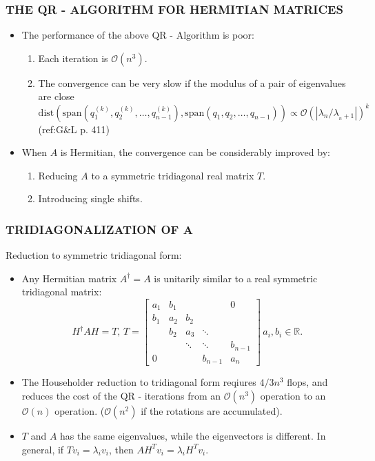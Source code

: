 \documentclass[a4paper,8pt]{beamer} %
\newcommand{\smatrix}[1]{\left[\begin{matrix} #1 \end{matrix}\right]}
\begin{document}
\begin{frame}[label=framelb1]  %
\frametitle{THE QR - ALGORITHM FOR HERMITIAN MATRICES }
\begin{itemize}
\item <1-> The performance of the above QR - Algorithm is poor:
	\begin{enumerate}
		\item Each iteration is $\mathcal O(n^3)$.
		\item The convergence can be very slow if the modulus of a pair of eigenvalues are close
		\[ \text{dist}(\text{span}(q_1^{(k)},q_2^{(k)},\dots,q_{n-1}^{(k)})
			,\text{span}(q_1,q_2,\dots,q_{n-1})) \propto \mathcal O(|\lambda_{n}/\lambda_{_n+1}|)^k \]
		(ref:G\&L p. 411)	
		\hyperlink{dist span}{\beamergotobutton{(*)}}
	\end{enumerate}
\item <2-> When $A$ is Hermitian, the convergence can be considerably improved by:
	\begin{enumerate}
		\item Reducing $A$ to a symmetric tridiagonal real matrix $T$.
		\item Introducing single shifts. 
	\end{enumerate}
\end{itemize}
\end{frame} %
\begin{frame}[label=tridiagonalizationofa]  %
\frametitle{TRIDIAGONALIZATION OF A}
Reduction to symmetric tridiagonal form:
\begin{itemize}
	\item <1-> Any Hermitian matrix $A^\dagger = A$ is unitarily similar to a real symmetric tridiagonal matrix:
\begin{equation}
H^\dagger AH = T,\, 
T=
	\smatrix{
		a_1 & b_1 & & & 0\\
		b_1 & a_2 & b_2 & & \\
		& b_2 & a_3 & \ddots & \\
		& & \ddots	& \ddots & b_{n-1} \\
		0& & & b_{n-1}& a_n 
	}
	\, a_i, b_i \in \mathbb R.
\end{equation}
	\item <2->
		The Householder reduction to tridiagonal form reqiures $ 4/3 n^3$ flops, and reduces the cost of the 
		QR - iterations from an $\mathcal O(n^3)$ operation to an $\mathcal O(n)$ operation. 
		($\mathcal O(n^2)$ if the rotations are accumulated).
	\item  <3->
		$T$ and $A$ has the same eigenvalues, while the eigenvectors 
		is different. In general, if $Tv_i = \lambda_iv_i$, then $A H^T v_i = \lambda_i H^Tv_i$.
\end{itemize}	
\begin{footnotesize}
	\hyperlink{householders explained}{\beamergotobutton{(*)}} 
\end{footnotesize}
\end{frame} %
\end{document}

